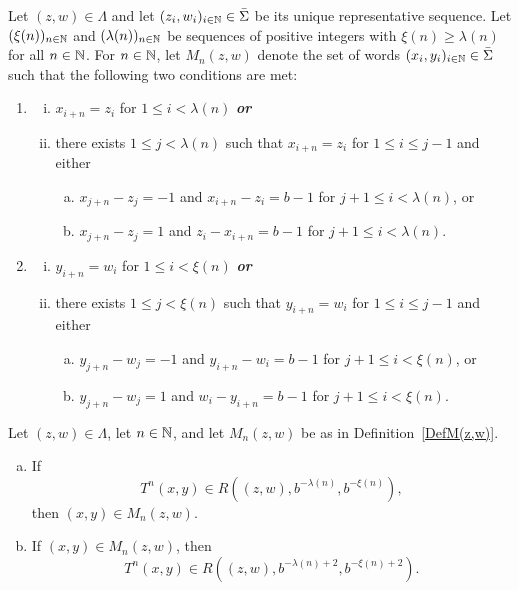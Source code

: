 \documentclass[10pt,a4paper]{amsart}
\newcommand{\N}{{\Bbb N}}         %
\begin{document}
\begin{definition} \label{DefM(z,w)}
Let $(z,w) \in \Lambda$ and let $(z_{i},w_{i})_{i \in \N} \in \bar{\Sigma}$ be its unique representative sequence.
Let $(\xi(n))_{n \in \N}$ and $(\lambda(n))_{n \in \N}$ be sequences of positive integers with $\xi(n) \geq \lambda(n)$ for all $n \in \N$. For $n \in \N$, let $M_{n}(z,w)$ denote the set of words $(x_{i},y_{i})_{i \in \N} \in \bar{\Sigma}$ such that the following two conditions are met:
\begin{enumerate}[(1)]
\item{
\begin{enumerate}[(i)]
\item{$x_{i+n}=z_{i}$ for $1 \leq i < \lambda(n)$ 
{\bf \emph{or}}}
\item{there exists $1\leq j < \lambda(n)$ such that $x_{i+n}=z_{i}$ for $1\leq i \leq j-1$ and either
\begin{enumerate}[(a)] 
\item{$x_{j+n}-z_{j}=-1$ and $x_{i+n}-z_{i}=b-1$ for $j+1 \leq i < \lambda(n)$, or}
\item{$x_{j+n}-z_{j}=1$ and $z_{i}-x_{i+n}=b-1$ for $j+1 \leq i < \lambda(n)$.}
\end{enumerate}}
\end{enumerate}}
\item{
\begin{enumerate}[(i)]
\item{$y_{i+n}=w_{i}$ for $1 \leq i < \xi(n)$ {\bf \emph{or}}} 
\item{there exists $1 \leq j < \xi(n)$ such that $y_{i+n}=w_{i}$ for $1\leq i \leq j-1$ and either
\begin{enumerate}[(a)] 
\item{$y_{j+n}-w_{j}=-1$ and $y_{i+n}-w_{i}=b-1$ for $j+1 \leq i < \xi(n)$, or}
\item{$y_{j+n}-w_{j}=1$ and $w_{i}-y_{i+n}=b-1$ for $j+1 \leq i < \xi(n)$.}
\end{enumerate}}
\end{enumerate}}
\end{enumerate}
 \end{definition}

 \begin{lemma} \label{upper}
 Let $(z,w) \in \Lambda$, let $n \in \N$, and let $M_{n}(z,w)$ be as in Definition~\ref{DefM(z,w)}.
 \begin{enumerate}[(a)]
 \item If
 \begin{equation*}
     T^{n}(x,y) \in R\left((z,w), b^{-\lambda(n)}, b^{-\xi(n)}\right),
 \end{equation*}
then $(x,y) \in M_n(z,w)$.
 \item If $(x,y) \in  M_{n}(z,w)$, then
 \begin{equation*}
     T^{n}(x,y) \in R\left((z,w), b^{-\lambda(n)+2}, b^{-\xi(n)+2}\right).
 \end{equation*}
\end{enumerate}
 \end{lemma}
\end{document}

